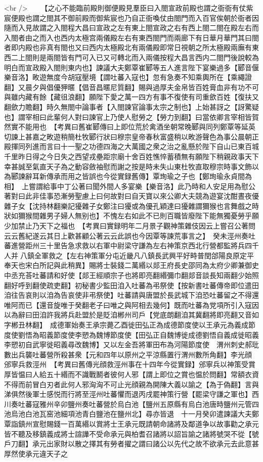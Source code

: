 <br />
　　【之心不能臨前殿則御便殿見羣臣曰入閤宣政前殿也謂之衙衙有仗紫宸便殿也謂之閤其不御前殿而御紫宸也乃自正衙喚仗由閤門而入百官俟朝於衙者因隨而入見故謂之入閤程大昌曰宣政之左有東上閤宣政之右有西上閤二閤在殿左右而入閤者由之而入也西内太極宫兩儀殿左右有東西閤門而兩廊下有日華月華門其曰閤者即内殿也非真有閤也又曰西内太極殿北有兩儀殿即常日視朝之所太極殿兩廡有東西二上閤則是兩閤皆有門可入已又可轉北而入兩儀按程大昌言西内二閤門後說較為明白而宣政殿入閤則東内也】諫議大夫鄭覃崔郾等五人進言陛下宴樂過多【郾音偃樂音洛】畋遊無度今胡寇壓境【謂吐蕃入寇也】忽有急奏不知乘輿所在【乘繩證翻】又晨夕與倡優狎暱【倡音昌暱尼質翻】賜與過厚夫金帛皆百姓膏血非有功不可與雖内藏有餘【藏徂浪翻】願陛下愛之萬一四方有事不復使有司重歛百姓【復扶又翻歛力贍翻】時久無閤中論事者【入閤諫官論事太宗之制也】上始甚訝之【訝驚疑也】謂宰相曰此輩何人對曰諫官上乃使人慰勞之【勞力到翻】曰當依卿言宰相皆賀然實不能用也　【考異曰舊崔郾傳曰上即位荒於禽酒坐朝常晚郾與同列鄭覃等延英切諫上甚嘉之畋遊稍簡杜牧郾行狀曰穆宗皇帝春秋富盛稍以畋游聲色為事公晨朝正殿揮同列進而言曰十一聖之功德四海之大萬國之衆之治之亂懸於陛下自山已東百城千里昨日得之今日失之西望戎壘距宗廟十舍百姓憔悴蓄積無有願陛下稍親政事天下幸甚誠至氣直天子為之動容斂袖慰而謝之按是時未失山東杜牧直取穆宗時事文飾以為郾諫辭耳新傳承而用之皆誤也今從實録舊傳】覃珣瑜之子也【鄭珣瑜永貞間為相】　上嘗謂給事中丁公著曰聞外間人多宴樂【樂音洛】此乃時和人安足用為慰公著對曰此非佳事恐漸勞聖慮上曰何故對曰自天寶以來公卿大夫競為遊宴沈酣晝夜優雜子女【沈持林翻樂記獶雜子女鄭注曰獶或為優孔穎達曰獶雜謂獮猴也言舞戲之時狀如獮猴間雜男子婦人無别也】不愧左右如此不已則百職皆廢陛下能無獨憂勞乎願少加禁止乃天下之福也　【考異曰實録明年二月景子觀神策雜伎因云上嘗召公著問云云舊紀遂云其日上歡甚顧公著云云此誤也今因覃等諫荒事言之】　癸未涇州奏吐蕃進營距州三十里告急求救以右軍中尉梁守謙為左右神策京西北行營都監將兵四千人并八鎮全軍救之【左右神策軍分屯近畿凡八鎮長武興平好畤普閏郃陽良原定平奉天也宋白所記與此稍異】賜將士裝錢二萬緡以郯王府長史邵同為太府少卿兼御史中丞充荅吐蕃請和好使【郯王經順宗子也將即亮翻緡彌巾翻郯音談長知兩翻少始照翻好呼到翻使疏吏翻】初秘書少監田洎入吐蕃為弔祭使【按新書吐蕃傳帝即位遣田洎往告哀則以洎為告哀使非弔祭使】吐蕃請與唐盟於長武城下洎恐吐蕃留之不得還唯阿而已【還音旋唯于癸翻老子曰唯之與阿相去幾何】既而吐蕃為党項所引入寇因以為辭曰田洎許我將兵赴盟於是貶洎郴州司戶【党底朗翻洎其冀翻將即亮翻又音如字郴丑林翻】　成德軍始奏王承宗薨乙酉徙田弘正為成德節度使以王承元為義成節度使劉悟為昭義節度使李愬為魏博節度使【田弘正自魏博徙成德劉悟自義成徙昭義李愬初自武寧徙昭義尋改魏博】又以左金吾將軍田布為河陽節度使　渭州刺史郝玭數出兵襲吐蕃營所殺甚衆【元和四年以原州之平涼縣置行渭州數所角翻】李光顔邠寧兵救涇州　【考異曰舊傳光顔救涇州事在十四年今從實録】邠寧兵以神策受賞厚皆愠曰人給五十緡而不識戰鬭者彼何人邪【謂上即位之賞也愠於問翻】常額衣資不得而前冒白刃者此何人邪洶洶不可止光顔親為開陳大義以諭之【為于偽翻】言與涕俱然後軍士感悦而行將至涇州吐蕃懼而退丙戌罷神策行營【罷梁守謙之軍也】西川奏吐蕃寇雅州辛卯鹽州奏吐蕃營於烏白池【鹽州五原縣有烏白池唐時鹽州元管四池烏池白池瓦窑池細項池青白鹽池在鹽州北】尋亦皆退　十一月癸卯遣諫議大夫鄭覃詣鎮州宣慰賜錢一百萬緡以賞將士王承元既請朝命諸將及鄰道争以故事勸之承元皆不聽及移鎮義成將士諠譁不受命承元與柏耆召諸將以詔旨諭之諸將號哭不從【號戶刀翻】承元出家財以散之擇其有勞者擢之謂曰諸公以先代之故不欲承元去此意甚厚然使承元違天子之